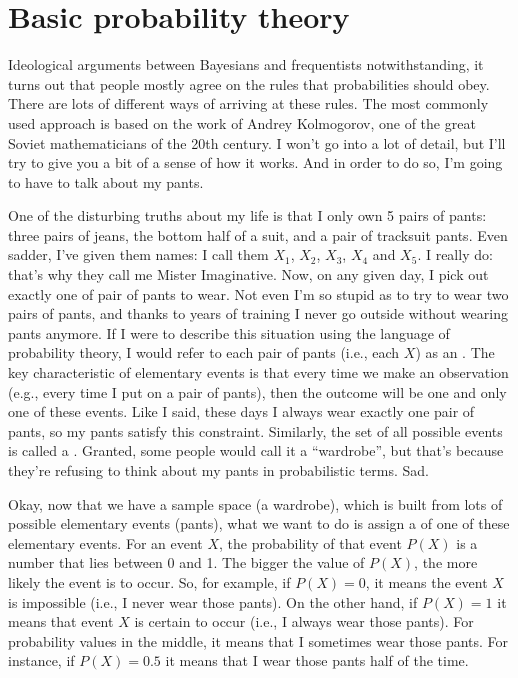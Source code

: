  
 
 
\section{Basic probability theory~\label{sec:basicprobability}}

Ideological arguments between Bayesians and frequentists notwithstanding, it turns out that people mostly agree on the rules that probabilities should obey. There are lots of different ways of arriving at these rules. The most commonly used approach is based on the work of Andrey Kolmogorov, one of the great Soviet mathematicians of the 20th century. I won't go into a lot of detail, but I'll try to give you a bit of a sense of how it works. And in order to do so, I'm going to have to talk about my pants.


One of the disturbing truths about my life is that I only own 5 pairs of pants: three pairs of jeans, the bottom half of a suit, and a pair of tracksuit pants. Even sadder, I've given them names: I call them $X_1$, $X_2$, $X_3$, $X_4$ and $X_5$. I really do: that's why they call me Mister Imaginative. Now, on any given day, I pick out exactly one of pair of pants to wear. Not even I'm so stupid as to try to wear two pairs of pants, and thanks to years of training I never go outside without wearing pants anymore. If I were to describe this situation using the language of probability theory, I would refer to each pair of pants (i.e., each $X$) as an . The key characteristic of elementary events is that every time we make an observation (e.g., every time I put on a pair of pants), then the outcome will be one and only one of these events. Like I said, these days I always wear exactly one pair of pants, so my pants satisfy this constraint. Similarly, the set of all possible events is called a . Granted, some people would call it a ``wardrobe'', but that's because they're refusing to think about my pants in probabilistic terms. Sad.  

Okay, now that we have a sample space (a wardrobe), which is built from lots of possible elementary events (pants), what we want to do is assign a  of one of these elementary events. For an event $X$, the probability of that event $P(X)$ is a number that lies between 0 and 1. The bigger the value of $P(X)$, the more likely the event is to occur. So, for example, if $P(X) = 0$, it means the event $X$ is impossible (i.e., I never wear those pants). On the other hand, if $P(X) = 1$ it means that event $X$ is certain to occur (i.e., I always wear those pants). For probability values in the middle, it means that I sometimes wear those pants. For instance, if $P(X) = 0.5$ it means that I wear those pants half of the time. 

